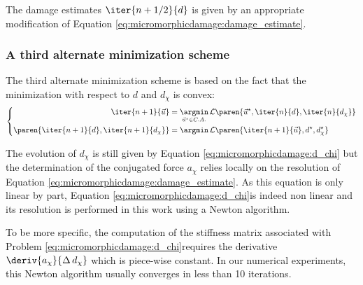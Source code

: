 The damage estimates $\iter{n+1/2}{d}$ is given by an appropriate
modification of Equation \eqref{eq:micromorphicdamage:damage_estimate}.

\subsubsection{A third alternate minimization scheme}

The third alternate minimization scheme is based on the fact that the
minimization with respect to $d$ and $d_{\chi}$ is convex:
\[
\left\{
\begin{aligned}
\iter{n+1}{\vec{u}} &= \underset{\vec{u}^{\star}\in C.A.}{\argmin}\, \mathcal{L}\paren{\vec{u}^{\star},\iter{n}{d},\iter{n}{d_{\chi}}}\\
\paren{\iter{n+1}{d},\iter{n+1}{d_{\chi}}} &= \argmin \,\mathcal{L}\paren{\iter{n+1}{\vec{u}},d^{\star},d_{\chi}^{\star}}
\end{aligned}
\right.
\]

The evolution of $d_{\chi}$ is still given by Equation
\eqref{eq:micromorphicdamage:d_chi} but the determination of the conjugated
force $a_{\chi}$ relies locally on the resolution of Equation
\eqref{eq:micromorphicdamage:damage_estimate}.
As this equation is only linear
by part, Equation \eqref{eq:micromorphicdamage:d_chi}is indeed non linear and
its resolution is performed in this work using a Newton algorithm.

To be more specific, the computation of the stiffness matrix associated
with Problem \eqref{eq:micromorphicdamage:d_chi}requires the derivative
$\deriv{a_{\chi}}{\Delta\,d_{\chi}}$ which is piece-wise constant. In
our numerical experiments, this Newton algorithm usually converges in
less than 10 iterations.